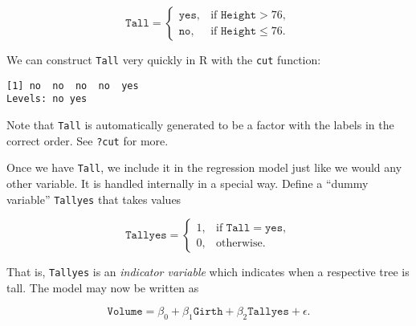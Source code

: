 \documentclass[]{book}
\newenvironment{Shaded}{\begin{snugshade}}{\end{snugshade}}
\newcommand{\KeywordTok}[1]{\textcolor[rgb]{0.13,0.29,0.53}{\textbf{{#1}}}}
\newcommand{\DataTypeTok}[1]{\textcolor[rgb]{0.13,0.29,0.53}{{#1}}}
\newcommand{\DecValTok}[1]{\textcolor[rgb]{0.00,0.00,0.81}{{#1}}}
\newcommand{\StringTok}[1]{\textcolor[rgb]{0.31,0.60,0.02}{{#1}}}
\newcommand{\OtherTok}[1]{\textcolor[rgb]{0.56,0.35,0.01}{{#1}}}
\newcommand{\NormalTok}[1]{{#1}}
\numberwithin{equation}{chapter}
\numberwithin{figure}{chapter}
\theoremstyle{plain}
\theoremstyle{definition}
\theoremstyle{remark}
\theoremstyle{definition}
\theoremstyle{definition}
\theoremstyle{remark}
\begin{document}
\begin{equation} \mathtt{Tall} = \begin{cases} \mathtt{yes}, & \mbox{if }\mathtt{Height} > 76,\\ \mathtt{no}, & \mbox{if }\mathtt{Height}\leq 76. \end{cases} \end{equation}

We can construct \texttt{Tall} very quickly in R with the \texttt{cut}
function:

\begin{Shaded}
\end{Shaded}

\begin{verbatim}
[1] no  no  no  no  yes
Levels: no yes
\end{verbatim}

Note that \texttt{Tall} is automatically generated to be a factor with
the labels in the correct order. See \texttt{?cut} for more.

Once we have \texttt{Tall}, we include it in the regression model just
like we would any other variable. It is handled internally in a special
way. Define a ``dummy variable'' \texttt{Tallyes} that takes values

\begin{equation} \mathtt{Tallyes} = \begin{cases} 1, & \mbox{if }\mathtt{Tall}=\mathtt{yes},\\ 0, & \mbox{otherwise.} \end{cases} \end{equation}

That is, \texttt{Tallyes} is an \emph{indicator variable} which
indicates when a respective tree is tall. The model may now be written
as

\begin{equation}
\mathtt{Volume}=\beta_{0}+\beta_{1}\mathtt{Girth}+\beta_{2}\mathtt{Tallyes}+\epsilon.
\end{equation}
\end{document}
